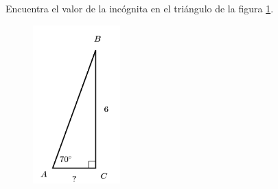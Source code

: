 Encuentra el valor de la incógnita en el triángulo de la figura \ref{fig:lados_functrig_25}.
\begin{figure}[H]
    \begin{center}
        \includegraphics[width=0.3\textwidth]{../images/lados_functrig_25.png}
    \end{center}
    \caption{}
    \label{fig:lados_functrig_25}
\end{figure}